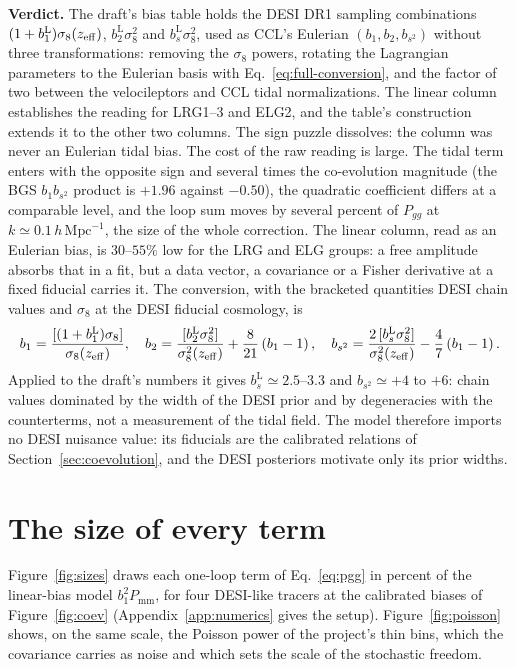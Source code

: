 \documentclass[11pt]{article}
\newcommand{\bone}{b_1}            %
\newcommand{\btwo}{b_2}            %
\newcommand{\bs}{b_{s^2}}          %
\newcommand{\boneL}{b_1^{\mathrm{L}}}
\newcommand{\btwoL}{b_2^{\mathrm{L}}}
\newcommand{\bsL}{b_s^{\mathrm{L}}}
\newcommand{\pnl}{P_{\mathrm{mm}}}
\newcommand{\hMpc}{\,h\,\mathrm{Mpc}^{-1}}
\begin{document}
\textbf{Verdict.}  The draft's bias table holds the DESI DR1 sampling
combinations $(1+\boneL)\sigma_8(z_{\rm eff})$, $\btwoL\sigma_8^2$ and
$\bsL\sigma_8^2$, used as CCL's Eulerian $(\bone,\btwo,\bs)$ without
three transformations: removing the $\sigma_8$ powers, rotating the
Lagrangian parameters to the Eulerian basis with
Eq.~\eqref{eq:full-conversion}, and the factor of two between the
velocileptors and CCL tidal normalizations.  The linear column
establishes the reading for LRG1--3 and ELG2, and the table's
construction extends it to the other two columns.  The sign puzzle
dissolves: the column was never an Eulerian tidal bias.  The cost of
the raw reading is large.  The tidal term enters with the opposite
sign and several times the co-evolution magnitude (the BGS $\bone\bs$
product is $+1.96$ against $-0.50$), the quadratic coefficient differs
at a comparable level, and the loop sum moves by several percent of
$P_{gg}$ at $k \simeq 0.1\hMpc$, the size of the whole correction.  The
linear column, read as an Eulerian bias, is $30$--$55\%$ low for the
LRG and ELG groups: a free amplitude absorbs that in a fit, but a data
vector, a covariance or a Fisher derivative at a fixed fiducial carries
it.  The conversion, with the bracketed quantities DESI chain values
and $\sigma_8$ at the DESI fiducial cosmology, is
\begin{equation}
\bone = \frac{[(1+\boneL)\sigma_8]}{\sigma_8(z_{\rm eff})} , \quad
\btwo = \frac{[\btwoL\sigma_8^2]}{\sigma_8^2(z_{\rm eff})}
 + \frac{8}{21}\left(\bone - 1\right) , \quad
\bs = \frac{2\,[\bsL\sigma_8^2]}{\sigma_8^2(z_{\rm eff})}
 - \frac{4}{7}\left(\bone - 1\right) .
\label{eq:recipe}
\end{equation}
Applied to the draft's numbers it gives $\bsL \simeq 2.5$--$3.3$ and
$\bs \simeq +4$ to $+6$: chain values dominated by the width of the
DESI prior and by degeneracies with the counterterms, not a measurement
of the tidal field.  The model therefore imports no DESI nuisance
value: its fiducials are the calibrated relations of
Section~\ref{sec:coevolution}, and the DESI posteriors motivate only
its prior widths.

\section{The size of every term}
\label{sec:sizes}

Figure~\ref{fig:sizes} draws each one-loop term of Eq.~\eqref{eq:pgg}
in percent of the linear-bias model $\bone^2\pnl$, for four DESI-like
tracers at the calibrated biases of Figure~\ref{fig:coev}
(Appendix~\ref{app:numerics} gives the setup).
Figure~\ref{fig:poisson} shows, on the same scale, the Poisson power of
the project's thin bins, which the covariance carries as noise and
which sets the scale of the stochastic freedom.
\end{document}
